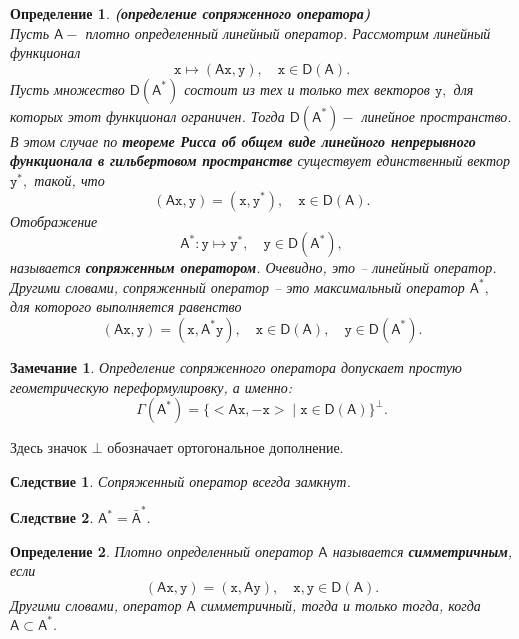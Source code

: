 \documentclass[12pt,a4paper]{article}
\theoremstyle{plain}   \newtheorem{Pro}{Задача}
\newtheorem{Def}{Определение}
\newtheorem{Rem}{Замечание}
\newtheorem{Cor}{Следствие}
\begin{document}
\begin{Def}
{\bfseries (определение сопряженного оператора)}\\
Пусть
$ \mathsf{A} - $
плотно определенный линейный оператор.
Рассмотрим линейный функционал
$$
  \mathtt{x} \mapsto (\mathsf{A}\mathtt{x},\mathtt{y}),
  \quad \mathtt{x} \in \mathsf{D}(\mathsf{A}).
$$
Пусть множество
$ \mathsf{D}(\mathsf{A}^{\ast}) $
состоит из тех и только тех векторов
$ \mathtt{y} , $
для которых этот функционал ограничен. Тогда
$ \mathsf{D}(\mathsf{A}^{\ast}) - $
линейное пространство. В этом случае по
{\bfseries теореме Рисса об общем виде линейного непрерывного
функционала в гильбертовом пространстве}
существует единственный вектор
$ \mathtt{y}^{\ast} , $
такой, что
$$
  (\mathsf{A}\mathtt{x},\mathtt{y})=
  (\mathtt{x},\mathtt{y}^{\ast}),
  \quad \mathtt{x} \in \mathsf{D}(\mathsf{A}) .
$$
Отображение
$$
  \mathsf{A}^{\ast}: \mathtt{y} \mapsto \mathtt{y}^{\ast},
  \quad \mathtt{y} \in \mathsf{D}(\mathsf{A}^{\ast}),
$$
называется
{\bfseries сопряженным оператором}.
Очевидно, это -- линейный
оператор.
\\
Другими словами, сопряженный оператор -- это максимальный оператор
$ \mathsf{A}^{\ast} , $
для которого выполняется равенство
$$
  (\mathsf{A}\mathtt{x},\mathtt{y})=
  (\mathtt{x},\mathsf{A}^{\ast}\mathtt{y}),
  \quad \mathtt{x} \in \mathsf{D}(\mathsf{A}),
  \quad \mathtt{y} \in \mathsf{D}(\mathsf{A}^{\ast}).
$$
\end{Def}
\begin{Rem}
Определение сопряженного оператора допускает простую
геометрическую переформулировку, а именно:
$$
  \Gamma (\mathsf{A}^{\ast})=
  \{ <\mathsf{A}\mathtt{x}, -\mathtt{x}> \; | \;
  \mathtt{x} \in \mathsf{D}(\mathsf{A}) \} ^{\bot}.
$$
\end{Rem}
Здесь значок
$ \bot $
обозначает ортогональное дополнение.
\begin{Cor}
Сопряженный оператор всегда замкнут.
\end{Cor}
\begin{Cor}
$ \mathsf{A}^{\ast}=\bar{\mathsf{A}}^{\ast} . $
\end{Cor}
\begin{Def}
Плотно определенный оператор
$ \mathsf{A} $
называется
{\bfseries симметричным},
если
$$
  (\mathsf{A}\mathtt{x},\mathtt{y})=
  (\mathtt{x},\mathsf{A}\mathtt{y}),
  \quad \mathtt{x}, \mathtt{y} \in \mathsf{D}(\mathsf{A}).
$$
Другими словами, оператор
$ \mathsf{A} $
симметричный, тогда и только тогда, когда
$ \mathsf{A} \subset \mathsf{A}^{\ast} . $
\end{Def}
\end{document}
